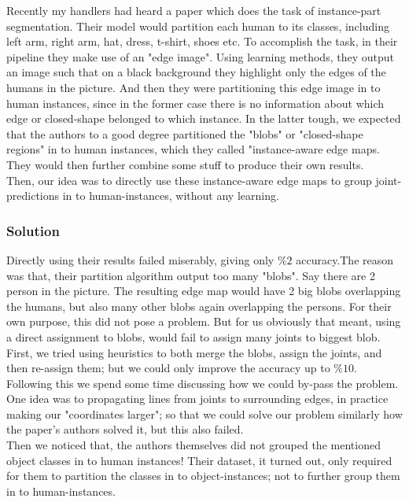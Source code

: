 \documentclass[titlepage, a4paper, 14pt]{extarticle} %
\begin{document}
Recently my handlers had heard a paper which does the task of instance-part segmentation. Their model would partition each human to its classes, including left arm, right arm, hat, dress, t-shirt, shoes etc. To accomplish the task, in their pipeline they make use of an "edge image". Using learning methods, they output an image such that on a black background they highlight only the edges of the humans in the picture. And then they were partitioning this edge image in to human instances, since in the former case there is no information about which edge or closed-shape belonged to which instance. In the latter tough, we expected that the authors to a good degree partitioned the "blobs" or "closed-shape regions" in to human instances, which they called "instance-aware edge maps. They would then further combine some stuff to produce their own results. \\

Then, our idea was to directly use these instance-aware edge maps to group joint-predictions in to human-instances, without any learning. 

\subsubsection{Solution} \label{ana}

Directly using their results failed miserably, giving only $\%2$ accuracy.The reason was that, their partition algorithm output too many "blobs". Say there are 2 person in the picture. The resulting edge map would have 2 big blobs overlapping the humans, but also many other blobs again overlapping the persons. For their own purpose, this did not pose a problem. But for us obviously that meant, using a direct assignment to blobs, would fail to assign many joints to biggest blob. \\

First, we tried using heuristics to both merge the blobs, assign the joints, and then re-assign them; but we could only improve the accuracy up to $\%10$. Following this we spend some time discussing how we could by-pass the problem. One idea was to propagating lines from joints to surrounding edges, in practice making our "coordinates larger"; so that we could solve our problem similarly how the paper's authors solved it, but this also failed. \\

Then we noticed that, the authors themselves did not grouped the mentioned object classes in to human instances! Their dataset, it turned out, only required for them to partition the classes in to object-instances; not to further group them in to human-instances. \\
\end{document}

